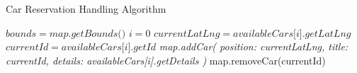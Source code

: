 \begin{algorithm}
\begin{algorithmic}[2]
  \caption{\label{alg:stdreqhandler} Car Reservation Handling Algorithm}

    \State $ bounds = \textit{map.getBounds()} $
    \State $ i = \textit{0}$
      \State $ currentLatLng = \textit{availableCars[i].getLatLng} $
      \State $ currentId = \textit{availableCars[i].getId} $
        \State \textit{map.addCar(
          \State position: currentLatLng,
          \State title: currentId,
          \State details: availableCars[i].getDetails
        \State )}
        \State map.removeCar(currentId)
      \EndIf
    \EndFor
  \EndFunction

\end{algorithmic}
\end{algorithm}
